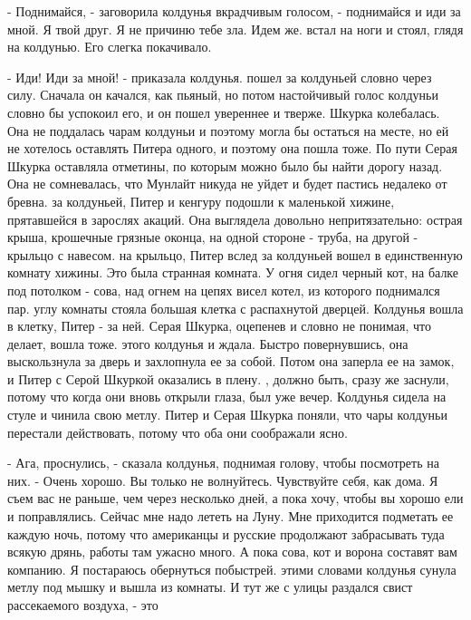 \par- Поднимайся, - заговорила колдунья вкрадчивым голосом, - 
поднимайся и иди за мной. Я твой друг. Я не причиню тебе зла. Идем же.
 встал на ноги и стоял, глядя на колдунью. Его слегка 
покачивало.
\par- Иди! Иди за мной! - приказала колдунья.
 пошел за колдуньей словно через силу. Сначала он качался, 
как пьяный, но потом настойчивый голос колдуньи словно бы успокоил 
его, и он пошел увереннее и тверже.
 Шкурка колебалась. Она не поддалась чарам колдуньи и поэтому 
могла бы остаться на месте, но ей не хотелось оставлять Питера одного, 
и поэтому она пошла тоже. По пути Серая Шкурка оставляла отметины, по 
которым можно было бы найти дорогу назад. Она не сомневалась, что 
Мунлайт никуда не уйдет и будет пастись недалеко от бревна.
 за колдуньей, Питер и кенгуру подошли к маленькой хижине, 
прятавшейся в зарослях акаций. Она выглядела довольно непритязательно: 
острая крыша, крошечные грязные оконца, на одной стороне - труба, на 
другой - крыльцо с навесом.
 на крыльцо, Питер вслед за колдуньей вошел в 
единственную комнату хижины. Это была странная комната. У огня сидел 
черный кот, на балке под потолком - сова, над огнем на цепях висел 
котел, из которого поднимался пар.
 углу комнаты стояла большая клетка с распахнутой дверцей. 
Колдунья вошла в клетку, Питер - за ней. Серая Шкурка, оцепенев и 
словно не понимая, что делает, вошла тоже.
 этого колдунья и ждала. Быстро повернувшись, она 
выскользнула за дверь и захлопнула ее за собой. Потом она заперла ее 
на замок, и Питер с Серой Шкуркой оказались в плену.
, должно быть, сразу же заснули, потому что когда они вновь 
открыли глаза, был уже вечер. Колдунья сидела на стуле и чинила свою 
метлу. Питер и Серая Шкурка поняли, что чары колдуньи перестали 
действовать, потому что оба они соображали ясно.
\par- Ага, проснулись, - сказала колдунья, поднимая голову, чтобы 
посмотреть на них. - Очень хорошо. Вы только не волнуйтесь. Чувствуйте 
себя, как дома. Я съем вас не раньше, чем через несколько дней, а пока 
хочу, чтобы вы хорошо ели и поправлялись. Сейчас мне надо лететь на 
Луну. Мне приходится подметать ее каждую ночь, потому что американцы и 
русские продолжают забрасывать туда всякую дрянь, работы там ужасно 
много. А пока сова, кот и ворона составят вам компанию. Я постараюсь 
обернуться побыстрей.
 этими словами колдунья сунула метлу под мышку и вышла из 
комнаты. И тут же с улицы раздался свист рассекаемого воздуха, - это 
